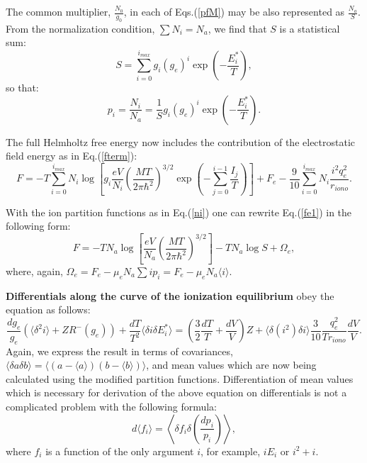 \documentclass[english,12pt]{revtex4}
\begin{document}
The common multiplier, $\frac{N_0}{g_0}$, in each of Eqs.(\ref{pfM}) may be also represented as $\frac{N_a}{S}$.
From the normalization condition, $\sum N_i = N_a$, we find that $S$ is a statistical sum:
\begin{equation}
S=\sum_{i=0}^{i_{max}} g_i (g_e)^i \exp\left(-\frac{E_i^*}T\right),
\end{equation}
so that:
\begin{equation}\label{ni}
p_i = \frac{N_i}{N_a} = \frac{1}S g_i (g_e)^i \exp \left( -\frac{E_i^*}T \right).
\end{equation}

The full Helmholtz free energy now includes the contribution of the electrostatic field energy as in Eq.(\ref{fterm}):
\begin{equation}\label{fe1}
F=-T
\sum_{i=0}^{i_{max}}{
N_i\log\left[g_i
  \frac{eV}{N_i}\left(\frac{MT}{2\pi \hbar^2}\right)^{3/2}\exp \left(-\sum_{j=0}^{i-1}\frac{I_j}T \right)\right]}+F_e
  -\frac{9}{10} \sum_{i=0}^{i_{max}} N_i \frac{i^2 q_e^2}{r_{iono}}.
\end{equation}  

With the ion partition functions as in Eq.(\ref{ni}) one can rewrite Eq.(\ref{fe1}) in the following form:
\begin{equation}\label{ffullm}
F = -TN_a\log\left[\frac{eV}{N_a}\left(\frac{MT}{2\pi \hbar^2}\right)^{3/2}\right]-TN_a\log S + \Omega_e, 
\end{equation}
where, again, $\Omega_e = F_e - \mu_e N_a \sum i p_i = F_e - \mu_e N_a \langle i \rangle $.

{\bf Differentials along the curve of the ionization equilibrium} obey the equation as follows:
\begin{equation}
\frac{dg_e}{g_e} (\langle \delta^2 i \rangle + ZR^-(g_e)) + \frac{dT}{T^2} \langle \delta i \delta E_i^* \rangle =
\left(\frac32 \frac{dT}T + \frac{dV}V\right) Z + \langle \delta(i^2) \delta i \rangle \frac{3}{10} \frac{q_e^2}{Tr_{iono}}
\frac{dV}{V}.
\end{equation}
Again, we express the result in terms of covariances,
$\langle \delta a \delta b \rangle = \langle (a - \langle a \rangle) (b - \langle b \rangle) \rangle$,
and mean values which are now being calculated
using the modified partition functions.
Differentiation of mean values which is necessary for derivation of the above equation on
differentials is not a complicated problem with the following formula:
\begin{equation}
d \langle f_i \rangle = \left\langle \delta f_i \delta\left( \frac{dp_i}{p_i} \right) \right\rangle,
\end{equation}
where $f_i$ is a function of the only argument $i$, for example, $iE_i$ or $i^2+i$.
\end{document}
